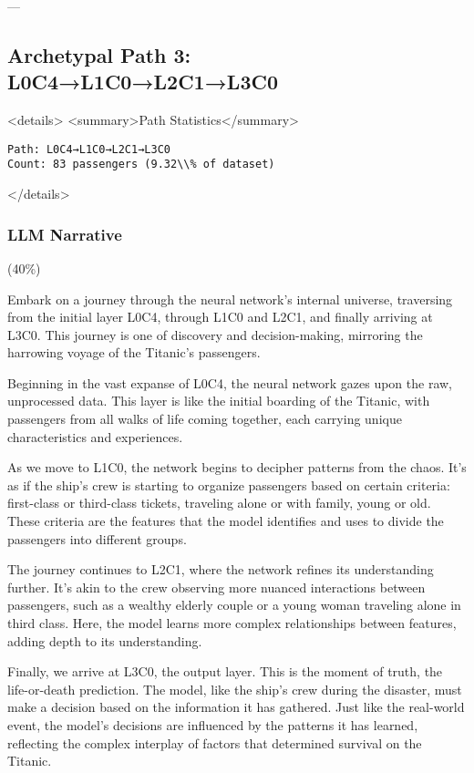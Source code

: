 ---

\subsection*{Archetypal Path 3: L0C4→L1C0→L2C1→L3C0}

<details>
<summary>Path Statistics</summary>

\begin{verbatim}
Path: L0C4→L1C0→L2C1→L3C0
Count: 83 passengers (9.32\\% of dataset)
\end{verbatim}
</details>

\subsubsection*{LLM Narrative}

(40\%)

Embark on a journey through the neural network's internal universe, traversing from the initial layer L0C4, through L1C0 and L2C1, and finally arriving at L3C0. This journey is one of discovery and decision-making, mirroring the harrowing voyage of the Titanic's passengers.

Beginning in the vast expanse of L0C4, the neural network gazes upon the raw, unprocessed data. This layer is like the initial boarding of the Titanic, with passengers from all walks of life coming together, each carrying unique characteristics and experiences.

As we move to L1C0, the network begins to decipher patterns from the chaos. It's as if the ship's crew is starting to organize passengers based on certain criteria: first-class or third-class tickets, traveling alone or with family, young or old. These criteria are the features that the model identifies and uses to divide the passengers into different groups.

The journey continues to L2C1, where the network refines its understanding further. It's akin to the crew observing more nuanced interactions between passengers, such as a wealthy elderly couple or a young woman traveling alone in third class. Here, the model learns more complex relationships between features, adding depth to its understanding.

Finally, we arrive at L3C0, the output layer. This is the moment of truth, the life-or-death prediction. The model, like the ship's crew during the disaster, must make a decision based on the information it has gathered. Just like the real-world event, the model's decisions are influenced by the patterns it has learned, reflecting the complex interplay of factors that determined survival on the Titanic.

